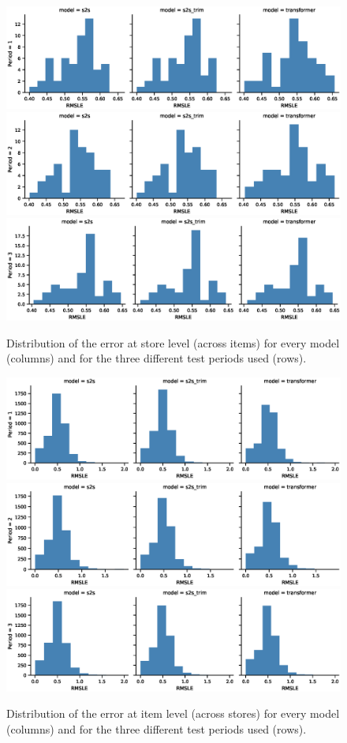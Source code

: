\documentclass{elsarticle}
\begin{document}
	
	    \begin{figure}[h!]
		\centering
		\includegraphics[width=0.7\linewidth]{img/rmsle_storewise_lag3}
		\includegraphics[width=0.7\linewidth]{img/rmsle_storewise_lag2}
		\includegraphics[width=0.7\linewidth]{img/rmsle_storewise_lag1}
		\caption{Distribution of the error at store level (across items) for every model (columns) and for the three different test periods used (rows).}
		\label{fig:stores_performance}
	\end{figure}


	\begin{figure}[h!]
		\centering
		\includegraphics[width=0.7\linewidth]{img/rmsle_itemwise_lag3}
		\includegraphics[width=0.7\linewidth]{img/rmsle_itemwise_lag2}
		\includegraphics[width=0.7\linewidth]{img/rmsle_itemwise_lag1}
		\caption{Distribution of the error at item level (across stores) for every model (columns) and for the three different test periods used (rows).}
		\label{fig:items_performance}
	\end{figure}
	
	
\end{document}
